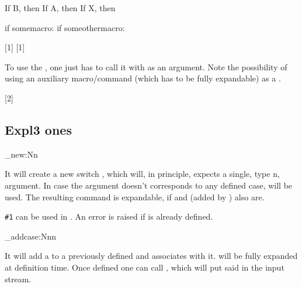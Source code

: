 \documentclass[10pt]{article}
\begin{document}
\begin{codestore}[switch02]
\def\somemacro{case-A}
\def\someothermacro{case-X}

If B, then 
If A, then 
If X, then 

if somemacro: \myCase{\somemacro}
if someothermacro: \myCase{\someothermacro}
\end{codestore}

[1]
[1]

To use the , one just has to call it with  as an argument. Note the possibility of using an auxiliary macro/command (which has to be fully expandable) as a .

[2]


\subsection{Expl3 ones}
\begin{codedescribe}{\switch_new:Nn}
\begin{codesyntax}%
  
\end{codesyntax}
It will create a new switch , which will, in principle, expects a single, type n, argument. In case the argument doesn't corresponds to any defined case,  will be used. The resulting  command is expandable, if  and  (added by ) also are. 
\end{codedescribe}
\begin{tsremark}
  \verb|#1| can be used in .  An error is raised if  is already defined.
\end{tsremark}

\begin{codedescribe}{\switch_addcase:Nnn}
\begin{codesyntax}%
  
\end{codesyntax}
It will add a  to a previously defined  and associates  with it.  will be fully expanded at definition time. Once defined one can call , which will put said  in the input stream. 
\end{codedescribe}
\end{document}

